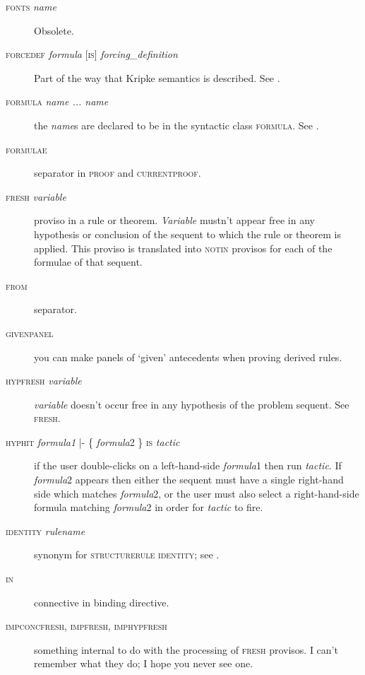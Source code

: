 \begin{description}
\item[\textsc{fonts} \textit{name}] Obsolete.

\item[\textsc{forcedef} \textit{formula} {[}\textsc{is}{]} \textit{forcing\_definition}] Part of the way that Kripke semantics is described. See .

\item[\textsc{formula} \textit{name ... name}] the \textit{name}s are declared to be in the syntactic class \textsc{formula}. See .

\item[\textsc{formulae}] separator in \textsc{proof} and \textsc{currentproof}.

\item[\textsc{fresh} \textit{variable}] proviso in a rule or theorem. \textit{Variable} mustn't appear free in any hypothesis or conclusion of the sequent to which the rule or theorem is applied. This proviso is translated into \textsc{notin} provisos for each of the formulae of that sequent.

\item[\textsc{from}] separator.

\item[\textsc{givenpanel}] you can make panels of `given' antecedents when proving derived rules.

\item[\textsc{hypfresh} \textit{variable}] \textit{variable} doesn't occur free in any hypothesis of the problem sequent. See \textsc{fresh.}

\item[\textsc{hyphit} \textit{formula1} |- \{ \textit{formula}2 \} \textsc{is} \textit{tactic}] if the user double-clicks on a left-hand-side \textit{formula}1 then run \textit{tactic}. If \textit{formula}2 appears then either the sequent must have a single right-hand side which matches \textit{formula}2, or the user must also select a right-hand-side formula matching \textit{formula}2 in order for \textit{tactic} to fire.

\item[\textsc{identity} \textit{rulename}] synonym for \textsc{structurerule} \textsc{identity}; see .

\item[\textsc{in}] connective in binding directive.

\item[\textsc{impconcfresh}, \textsc{impfresh}, \textsc{imphypfresh}] something internal to do with the processing of \textsc{fresh} provisos. I can't remember what they do; I hope you never see one.


\end{description}
